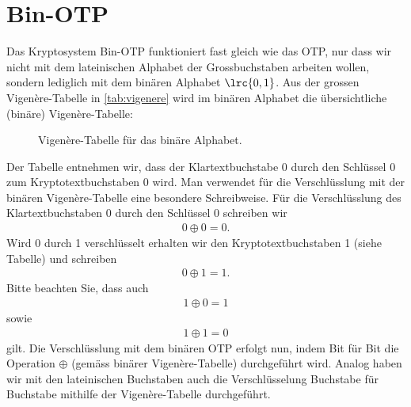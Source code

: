 \section{Bin-\gls{OTP}}
Das Kryptosystem Bin-\gls{OTP} funktioniert fast gleich wie das \gls{OTP}, nur dass wir nicht mit dem lateinischen Alphabet der Grossbuchstaben arbeiten wollen, sondern lediglich mit dem binären Alphabet $\lrc{0,1}$. Aus der grossen Vigenère-Tabelle in \cref{tab:vigenere} wird im binären Alphabet die übersichtliche (binäre) Vigenère-Tabelle:
\begin{figure}[H]
	\centering
	\caption{Vigenère-Tabelle für das binäre Alphabet.}
	\label{fig:VigenereBin}
\end{figure}
\noindent
Der Tabelle entnehmen wir, dass der Klartextbuchstabe $0$ durch den Schlüssel $0$ zum Kryptotextbuchstaben $0$ wird. Man verwendet für die Verschlüsslung mit der binären Vigenère-Tabelle eine besondere Schreibweise. Für die Verschlüsslung des Klartextbuchstaben $0$ durch den Schlüssel $0$ schreiben wir
\begin{align*}
	0 \oplus 0 = 0.
\end{align*}
Wird 0 durch 1 verschlüsselt erhalten wir den Kryptotextbuchstaben 1 (siehe Tabelle) und schreiben
\begin{align*}
	0 \oplus 1 = 1.
\end{align*}
Bitte beachten Sie, dass auch
\begin{align*}
	1 \oplus 0 = 1
\end{align*}
sowie
\begin{align*}
	1 \oplus 1 = 0
\end{align*}
gilt.
\noindent
Die Verschlüsslung mit dem binären \gls{OTP} erfolgt nun, indem Bit für Bit die Operation $\oplus$ (gemäss binärer Vigenère-Tabelle) durchgeführt wird. Analog haben wir mit den lateinischen Buchstaben auch die Verschlüsselung Buchstabe für Buchstabe mithilfe der Vigenère-Tabelle durchgeführt.

